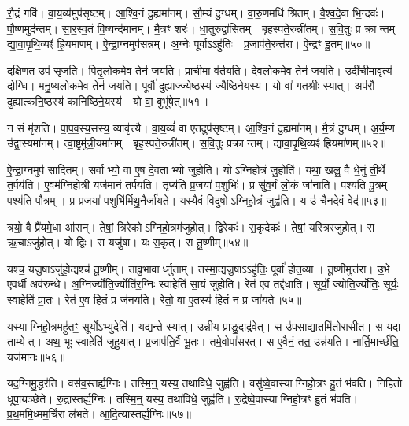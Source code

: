 रौ॒द्रं गवि॑।
वा॒य॒व्य॑मुप॑सृष्टम्।
आ॒श्वि॒नं दु॒ह्यमा॑नम्।
सौ॒म्यं दु॒ग्धम्।
वा॒रु॒णमधि॑ श्रितम्।
वै॒श्व॒दे॒वा भि॒न्दवः॑।
पौ॒ष्णमुद॑न्तम्।
सा॒र॒स्व॒तं वि॒ष्यन्द॑मानम्।
मै॒त्रꣳ शरः॑।
धा॒तुरुद्वा॑सितम्।
बृह॒स्पते॒रुन्नी॑तम्।
स॒वि॒तुः प्र क्रान्तम्।
द्या॒वा॒पृ॒थि॒व्यꣴ॑ ह्रि॒यमा॑णम्।
ऐ॒न्द्रा॒ग्नमुप॑सन्नम्।
अ॒ग्नेः पूर्वा\-ऽऽहु॑तिः।
प्र॒जाप॑ते॒रुत्त॑रा।
ऐ॒न्द्रꣳ हु॒तम्॥५०॥\anuvakamend[उद्वा॑सितꣳ स॒प्त च॑]

द॒क्षि॒ण॒त उप॑ सृजति।
पि॒तृ॒लो॒कमे॒व तेन॑ जयति।
प्राची॒मा व॑र्तयति।
दे॒व॒लो॒कमे॒व तेन॑ जयति।
उदी॑चीमा॒वृत्य॑ दोग्धि।
म॒नु॒ष्य॒लो॒कमे॒व तेन॑ जयति।
पूर्वौ॑ दुह्याज्ज्ये॒ष्ठस्य॑ ज्यैष्ठिने॒यस्य॑।
यो वा॑ ग॒तश्रीः॒ स्यात्।
अप॑रौ दुह्यात्कनि॒ष्ठस्य॑ कानिष्ठिने॒यस्य॑।
यो वा॒ बुभू॑षेत्॥५१॥

न सं मृ॑शति।
पा॒प॒व॒स्य॒सस्य॒ व्यावृ॑त्त्यै।
वा॒य॒व्यं॑ वा ए॒तदुप॑सृष्टम्।
आ॒श्वि॒नं दु॒ह्यमा॑नम्।
मै॒त्रं दु॒ग्धम्।
अ॒र्य॒म्ण उ॑द्वा॒स्यमा॑नम्।
त्वा॒ष्ट्रमु॑न्नी॒यमा॑नम्।
बृह॒स्पते॒रुन्नी॑तम्।
स॒वि॒तुः प्रक्रान्तम्।
द्या॒वा॒पृ॒थि॒व्यꣴ॑ ह्रि॒यमा॑णम्॥५२॥

ऐ॒न्द्रा॒ग्नमुप॑ सादितम्।
सर्वाभ्यो॒ वा ए॒ष दे॒वताभ्यो जुहोति।
योऽग्निहो॒त्रं जु॒होति॑।
यथा॒ खलु॒ वै धे॒नुं ती॒र्थे त॒र्पय॑ति।
ए॒वम॑ग्निहो॒त्री यज॑मानं तर्पयति।
तृप्य॑ति प्र॒जया॑ प॒शुभिः॑।
प्र सु॑व॒र्गं लो॒कं जा॑नाति।
पश्य॑ति पु॒त्रम्।
पश्य॑ति॒ पौत्रम्।
प्र प्र॒जया॑ प॒शुभि॑र्मिथु॒नैर्जा॑यते।
यस्यै॒वं वि॒दुषो\-ऽग्निहो॒त्रं जुह्व॑ति।
य उ॑ चैनदे॒वं वेद॑॥५३॥\anuvakamend[बुभू॑षेद्ध्रि॒यमा॑णञ्जायते॒ द्वे च॑]

त्रयो॒ वै प्रै॑यमे॒धा आ॑सन्।
तेषां॒ त्रिरेको\-ऽग्निहो॒त्रम॑जुहोत्।
द्विरेकः॑।
स॒कृदेकः॑।
तेषां॒ यस्त्रिरजु॑होत्।
स ऋ॒चा\-ऽजु॑होत्।
यो द्विः।
स यजु॑षा।
यः स॒कृत्।
स तू॒ष्णीम्॥५४॥

यश्च॒ यजु॒षा\-ऽजु॑हो॒द्यश्च॑ तू॒ष्णीम्।
तावु॒भावार्ध्नुताम्।
तस्मा॒द्यजु॒षा\-ऽऽहु॑तिः॒ पूर्वा॑ होत॒व्या।
तू॒ष्णीमुत्त॑रा।
उ॒भे ए॒वर्धी अव॑रुन्धे।
अ॒ग्निर्ज्योति॒र्ज्योति॑र॒ग्निः स्वाहेति॑ सा॒यं जु॑होति।
रेत॑ ए॒व तद्द॑धाति।
सूर्यो॒ ज्योति॒र्ज्योतिः॒ सूर्यः॒ स्वाहेति॑ प्रा॒तः।
रेत॑ ए॒व हि॒तं प्र ज॑नयति।
रेतो॒ वा ए॒तस्य॑ हि॒तं न प्र जा॑यते॥५५॥

यस्याग्निहो॒त्रमहु॑त॒ꣳ॒ सूर्यो॒\-ऽभ्यु॑देति॑।
यद्यन्ते॒ स्यात्।
उ॒न्नीय॒ प्राङु॒दाद्र॑वेत्।
स उ॑प॒साद्यातमि॑तोरासीत।
स य॒दा ताम्येत्।
अथ॒ भूः स्वाहेति॑ जुहुयात्।
प्र॒जाप॑ति॒र्वै भू॒तः।
तमे॒वोपा॑सरत्।
स ए॒वैनं॒ तत॒ उन्न॑यति।
नार्ति॒मार्च्छ॑ति॒ यज॑मानः॥५६॥\anuvakamend[तू॒ष्णीं जा॑यते॒ यज॑मानः]

यद॒ग्निमु॒द्धर॑ति।
वस॑व॒स्तर्ह्य॒ग्निः।
तस्मि॒न्॒ यस्य॒ तथा॑विधे॒ जुह्व॑ति।
वसु॑ष्वे॒वास्याग्निहो॒त्रꣳ हु॒तं भ॑वति।
निहि॑तो धूपा॒यञ्छे॑ते।
रु॒द्रास्तर्ह्य॒ग्निः।
तस्मि॒न्॒ यस्य॒ तथा॑विधे॒ जुह्व॑ति।
रु॒द्रेष्वे॒वास्याग्निहो॒त्रꣳ हु॒तं भ॑वति।
प्र॒थ॒ममि॒ध्मम॒र्चिरा ल॑भते।
आ॒दि॒त्यास्तर्ह्य॒ग्निः॥५७॥


